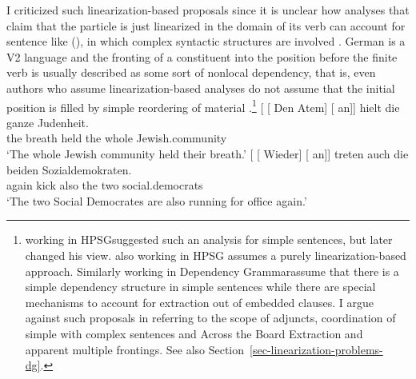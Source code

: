 \begin{exe}
\begin{xlist}[iv.]
\begin{exe}
\begin{xlist}[iv.]
I criticized such linearization-based proposals since it is unclear how
analyses that claim that the particle is just linearized in the domain of its verb can account for
sentence like (), in which complex syntactic structures are involved \citep{Mueller2007d}. German is a V2 language
and the fronting of a constituent into the position before the finite verb is usually described as
some sort of nonlocal dependency, that is, even authors who assume linearization-based analyses do
not assume that the initial position is filled by simple reordering of material
\citep{Kathol2000a,Mueller99a,Mueller2002b,TBjerre2006a}.\footnote{
  \citet[Section~6.3]{Kathol95a} working in HPSG\indexhpsg suggested such an analysis for simple sentences, but later
  changed his view. \citet{Wetta2011a} also working in HPSG assumes a purely linearization-based
  approach. Similarly \citet{GO2009a} working in  Dependency Grammar\indexdg assume that there is a
  simple dependency structure in simple sentences while there are special mechanisms to account for
  extraction out of embedded clauses. I argue against such proposals in  referring
  to the scope of adjuncts, coordination of simple with complex sentences and Across the Board
  Extraction and apparent multiple frontings. See also Section~\ref{sec-linearization-problems-dg}.
}
\eal
\label{ex-complex-vf}
\ex
\gll {}[ [ Den Atem]  [ an]] hielt die ganze Judenheit.\footnotemark\\
       {}        {}        the breath {}    \partic{}  held  the whole Jewish.community\\
\glt `The whole Jewish community held their breath.'
\ex\label{bsp-wieder-an-tritt-zwei}
\gll {}[ [ Wieder] [ an]] treten auch die beiden Sozialdemokraten.\footnotemark\\
      {}         {}        again   {}        \partic{} kick also the two social.democrats\\
\glt `The two Social Democrates are also running for office again.' %


\end{xlist}
\end{exe}
\end{xlist}
\end{exe}

